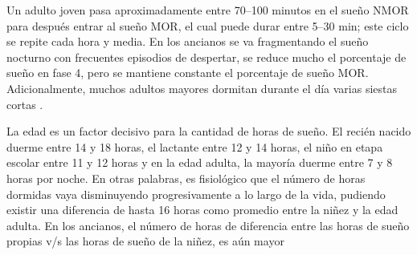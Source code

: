 Un adulto joven pasa aproximadamente entre 70--100 minutos en el sue\~no NMOR para despu\'es entrar 
al sue\~no MOR, el cual puede durar entre 5--30 min; este ciclo se repite cada hora y media.
En los ancianos se va fragmentando el sue\~no nocturno con frecuentes episodios de despertar, se 
reduce mucho el porcentaje de sue\~no en fase 4, pero se mantiene constante el porcentaje de 
sue\~no MOR. Adicionalmente, muchos adultos mayores dormitan durante el d\'ia varias siestas cortas 
\cite{CarrilloMora}.

La edad es un factor decisivo para la cantidad de horas de sueño. El recién nacido duerme entre 14 y 18 horas, el lactante entre 12 y 14 horas, el niño en etapa escolar entre 11 y 12 horas y en la edad adulta, la mayoría duerme entre 7 y 8 horas por noche. En otras palabras, es fisiológico que el número de horas dormidas vaya disminuyendo progresivamente a lo largo de la vida, pudiendo existir una diferencia de hasta 16 horas como promedio entre la niñez y la edad adulta. En los ancianos, el número de horas de diferencia entre las horas de sueño propias v/s las horas de sueño de la niñez, es aún mayor

\cite{Contreras13}

